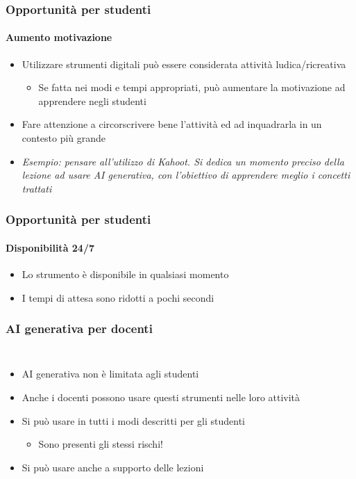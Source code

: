 \begin{contentframe}
    \frametitle{Opportunità per studenti}
    \framesubtitle{Aumento motivazione}

    \begin{itemize}
        \item Utilizzare strumenti digitali può essere considerata attività ludica/ricreativa
        \begin{itemize}
            \item Se fatta nei modi e tempi appropriati, può aumentare la motivazione ad apprendere negli studenti
        \end{itemize}
        
        \bigskip
        \item Fare attenzione a circorscrivere bene l'attività ed ad inquadrarla in un contesto più grande

        \bigskip
        \item \textit{Esempio: pensare all'utilizzo di Kahoot. Si dedica un momento preciso della lezione ad usare AI generativa, con l'obiettivo di apprendere meglio i concetti trattati}
    \end{itemize}
\end{contentframe}

\begin{contentframe}
    \frametitle{Opportunità per studenti}
    \framesubtitle{Disponibilità 24/7}

    \begin{itemize}
        \item Lo strumento è disponibile in qualsiasi momento
        \bigskip
        \item I tempi di attesa sono ridotti a pochi secondi
    \end{itemize}
\end{contentframe}

\begin{contentframe}
    \frametitle{AI generativa per docenti}

    \begin{columns}
        \begin{itemize}
            \item AI generativa non è limitata agli studenti
            \item Anche i docenti possono usare questi strumenti nelle loro attività
    
            \bigskip
            \item Si può usare in tutti i modi descritti per gli studenti
            \begin{itemize}
                \item Sono presenti gli stessi rischi!
            \end{itemize}
            \item Si può usare anche a supporto delle lezioni
        \end{itemize}
        
        \centering
    \end{columns}
\end{contentframe}


